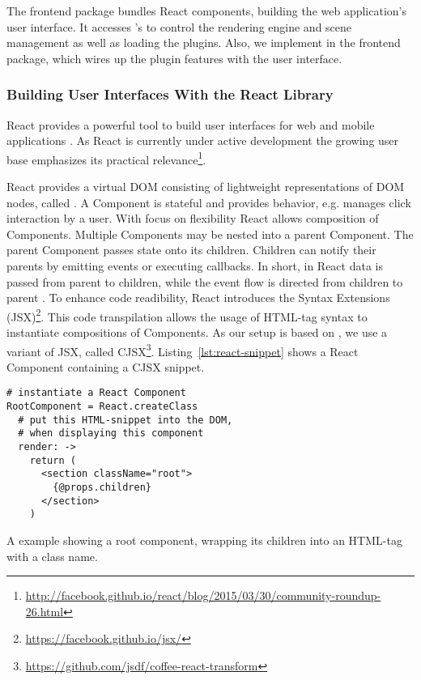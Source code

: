\documentclass[../../ClassicThesis.tex]{subfiles}
\begin{document}
The frontend package bundles React components, building the web
application's user interface. It accesses {\convertify}'s
 to control the rendering engine and scene
management as well as loading the plugins. Also, we implement
 in the frontend package, which wires up the plugin
features with the user interface.

\subsubsection{Building User Interfaces With the React Library}
\label{sec:ui-with-react}

React provides a powerful tool to build user interfaces for web and
mobile applications \cite{React13}. As React is currently under active
development the growing user base emphasizes its practical
relevance\footnote{\url{http://facebook.github.io/react/blog/2015/03/30/community-roundup-26.html}}.

React provides a virtual DOM consisting of lightweight representations
of DOM nodes, called  \cite{React13}. A Component is
stateful and provides behavior, e.g. manages click interaction by a
user. With focus on flexibility React allows composition of
Components. Multiple Components may be nested into a parent Component.
The parent Component passes state onto its children. Children can
notify their parents by emitting events or executing callbacks. In
short, in React data is passed from parent to children, while the
event flow is directed from children to parent
\cite{ReactDocComponents}. To enhance code readibility, React
introduces the {\javascript} Syntax Extensions
(JSX)\footnote{\url{https://facebook.github.io/jsx/}}. This code
transpilation allows the usage of HTML-tag syntax to instantiate
compositions of Components. As our setup is based on {\coffeescript},
we use a {\coffeescript} variant of JSX, called
CJSX\footnote{\url{https://github.com/jsdf/coffee-react-transform}}.
Listing~\ref{lst:react-snippet} shows a React Component containing a CJSX
snippet.

\begin{listing}[h]
\begin{verbatim}
# instantiate a React Component
RootComponent = React.createClass
  # put this HTML-snippet into the DOM,
  # when displaying this component
  render: ->
    return (
      <section className="root">
        {@props.children}
      </section>
    )
\end{verbatim}
\caption{A {\coffeescript} example showing a root component, wrapping
  its children into an HTML-tag with a class name.}
\label{lst:react-snippet}
\end{listing}
\end{document}
